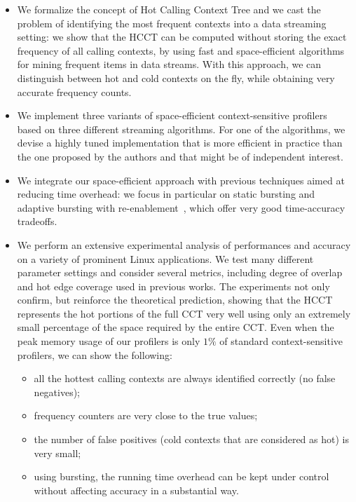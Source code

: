 \documentclass[preprint]{sigplanconf}
\begin{document}
\begin{itemize}

\item We formalize the concept of Hot Calling Context Tree and we cast the problem of identifying the most frequent contexts into a data streaming setting: we show that the HCCT can be computed without storing the exact frequency of all calling contexts, by using fast and space-efficient algorithms for mining frequent items in data streams. With this approach, we can distinguish between hot and cold contexts on the fly, while obtaining very accurate frequency counts. 

\item We implement three variants of space-efficient context-sensitive profilers based on three different streaming algorithms. For one of the algorithms, we devise  a highly tuned implementation that is more efficient in practice than the one proposed by the authors and that might be of independent interest.  

\item We integrate our space-efficient approach with previous techniques aimed at reducing time overhead: we focus in particular on static bursting and adaptive bursting with re-enablement~\cite{ZSCC06}, which offer very good time-accuracy tradeoffs.

\item We perform an extensive experimental analysis of performances and accuracy on a variety of prominent Linux applications. We test many different parameter settings and consider several metrics, including degree of overlap and hot edge coverage used in previous works.  The experiments not only confirm, but reinforce the theoretical prediction, showing that the HCCT represents the hot portions of the full CCT very well using only an extremely small percentage of the space required by the entire CCT. Even when the peak memory usage of our profilers is only $1\%$ of standard context-sensitive profilers, we can show the following:

\begin{itemize}
\item all the hottest calling contexts are always identified correctly (no false negatives);

\item frequency counters are very close to the true values;

\item the number of false positives (cold contexts that are considered as hot) is very small;

\item using bursting, the running time overhead can be kept under control without affecting accuracy in a substantial way. 
\end{itemize} 

\end{itemize}
\end{document}
